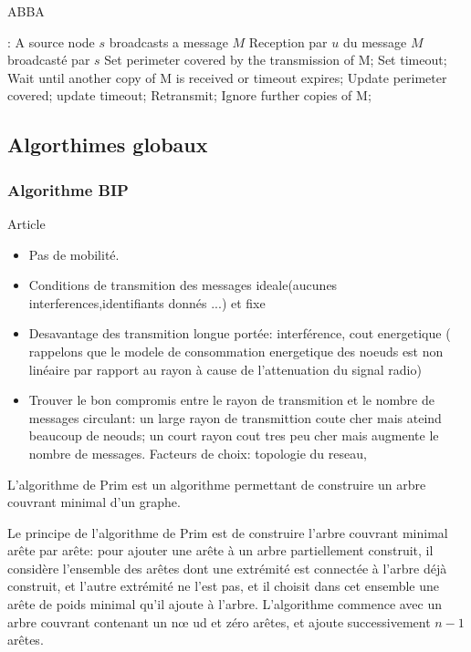 \begin{algorithm}[h]
\caption{ABBA}
\label{ABBA}
\begin{algorithmic}
\REQUIRE:
A source node $s$ broadcasts a message $M$
\STATE Reception  par  $u$ du message $M$ broadcasté par $s$
\STATE Set perimeter covered by the transmission of M;
\STATE Set timeout;
\REPEAT
    \STATE Wait until another copy of M is received or timeout expires;
	\STATE Update perimeter covered;
	\STATE update timeout;
    \ENDIF
{}
    \STATE Retransmit;
\ENDIF
     \STATE Ignore further copies of M;

\end{algorithmic}
\end{algorithm}




\subsection{Algorthimes globaux}
\subsubsection{Algorithme BIP}
Article \cite{Wieselthier2000}
\begin{itemize}
 \item Pas de mobilité.
 \item Conditions de transmition des messages ideale(aucunes interferences,identifiants donnés ...)  et fixe
 \item Desavantage des transmition longue portée: interférence, cout energetique ( rappelons que le modele de consommation energetique des noeuds est non linéaire par rapport au rayon à cause de l'attenuation du signal radio)
 \item Trouver le bon compromis entre le rayon de transmition et le nombre de messages circulant: un large rayon de transmittion coute cher mais ateind beaucoup de neouds; un court rayon cout tres peu cher mais 
augmente le nombre de messages. Facteurs de choix: topologie du reseau,



\end{itemize}

  L'algorithme de Prim est un algorithme permettant de construire un arbre
  couvrant minimal d'un graphe. 

  Le principe de l'algorithme de Prim est de construire l'arbre couvrant
  minimal arête par arête: pour ajouter une arête à un arbre partiellement
  construit, il considère l'ensemble des arêtes dont une extrémité est
  connectée à l'arbre déjà construit, et l'autre extrémité ne l'est pas, et
  il choisit dans cet ensemble une arête de poids minimal qu'il ajoute à
  l'arbre. L'algorithme commence avec un arbre couvrant contenant un n\oe
  ud et zéro arêtes, et ajoute successivement $n-1$ arêtes.


